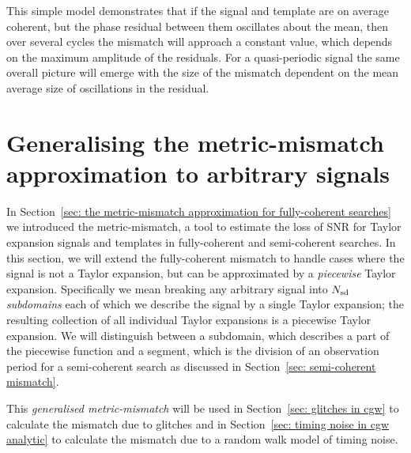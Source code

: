\documentclass[../full_thesis/full_thesis.tex]{subfiles}
\begin{document}
This simple model demonstrates that if the signal and template are on average
coherent, but the phase residual between them oscillates about the mean, then
over several cycles the mismatch will approach a constant value, which depends on
the maximum amplitude of the residuals.  For a quasi-periodic signal the same
overall picture will emerge with the size of the mismatch dependent on the mean
average size of oscillations in the residual.

\section{Generalising the metric-mismatch approximation to arbitrary signals}
\label{sec: generalising the metric-mismatch}
In Section~\ref{sec: the metric-mismatch approximation for fully-coherent searches}
we introduced the metric-mismatch, a tool to estimate
the loss of SNR for Taylor expansion signals and templates in fully-coherent
and semi-coherent searches. In this section, we will extend the fully-coherent
mismatch to handle cases where the signal is not a Taylor expansion, but can
be approximated by a \emph{piecewise} Taylor expansion. Specifically we mean
breaking any arbitrary signal into $N_{\textrm{sd}}$ \emph{subdomains} each of which we
describe the signal by a single Taylor expansion; the resulting collection of
all individual Taylor expansions is a piecewise Taylor expansion. We will
distinguish between a subdomain, which describes a part of the piecewise
function and a segment, which is the division of an observation period for a
semi-coherent search as discussed in Section~\ref{sec: semi-coherent mismatch}. 

This \emph{generalised metric-mismatch} will be used in Section~\ref{sec: glitches
in cgw} to calculate the mismatch due to glitches and in Section~\ref{sec: timing
noise in cgw analytic} to calculate the mismatch due to a random walk model of
timing noise.


\end{document}
